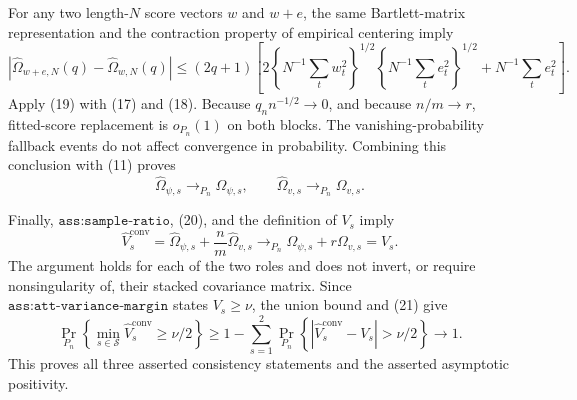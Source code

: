 For any two length-\(N\) score vectors \(w\) and \(w+e\), the same Bartlett-matrix representation and the contraction property of empirical centering imply
\[
 |\widehat\Omega_{w+e,N}(q)-\widehat\Omega_{w,N}(q)|
 \leq(2q+1)\left[
  2\left\{N^{-1}\sum_tw_t^2\right\}^{1/2}
    \left\{N^{-1}\sum_te_t^2\right\}^{1/2}
  +N^{-1}\sum_te_t^2
 \right].                                                                           \tag{19}
\]
Apply (19) with (17) and (18).  Because \(q_n n^{-1/2}\to0\), and because \(n/m\to r\), fitted-score replacement is \(o_{P_n}(1)\) on both blocks.  The vanishing-probability fallback events do not affect convergence in probability.  Combining this conclusion with (11) proves
\[
 \widehat\Omega_{\psi,s}\to_{P_n}\Omega_{\psi,s},
 \qquad
 \widehat\Omega_{v,s}\to_{P_n}\Omega_{v,s}.                                       \tag{20}
\]

Finally, \(\texttt{ass:sample-ratio}\), (20), and the definition of \(V_s\) imply
\[
 \widehat V_s^{\mathrm{conv}}
 =\widehat\Omega_{\psi,s}+\frac nm\widehat\Omega_{v,s}
 \to_{P_n}\Omega_{\psi,s}+r\Omega_{v,s}=V_s.                                     \tag{21}
\]
The argument holds for each of the two roles and does not invert, or require nonsingularity of, their stacked covariance matrix.  Since \(\texttt{ass:att-variance-margin}\) states \(V_s\geq\nu\), the union bound and (21) give
\[
 \Pr_{P_n}\left\{\min_{s\in\mathcal S}\widehat V_s^{\mathrm{conv}}\geq\nu/2\right\}
 \geq 1-\sum_{s=1}^2
 \Pr_{P_n}\left\{|\widehat V_s^{\mathrm{conv}}-V_s|>\nu/2\right\}
 \longrightarrow1.
\]
This proves all three asserted consistency statements and the asserted asymptotic positivity.
